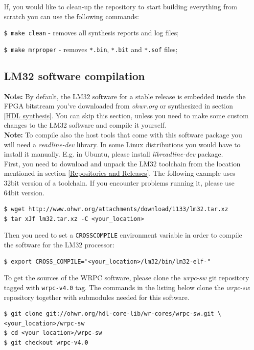 \documentclass[a4paper, 12pt]{article}
\renewcommand{\_}{\underscore\allowbreak}
\begin{document}
If, you would like to clean-up the repository to start building everything from
scratch you can use the following commands:
\begin{itemize*}
\item \texttt{\$ make clean} - removes all synthesis reports and log files;
\item \texttt{\$ make mrproper} - removes \texttt{*.bin}, \texttt{*.bit} and
  \texttt{*.sof} files;
\end{itemize*}

\subsection{LM32 software compilation}
\label{LM32 software compilation}

\textbf{Note:} By default, the LM32 software for a stable release is embedded
inside the FPGA bitstream you've downloaded from \textit{ohwr.org} or
synthesized in section \ref{HDL synthesis}. You can skip this section, unless
you need to make some custom changes to the LM32 software and compile it
yourself.\\

\textbf{Note:} To compile also the host tools that come with this software
package you will need a \emph{readline-dev} library. In some Linux distributions
you would have to install it manually. E.g. in Ubuntu, please install
\emph{libreadline-dev} package.\\

First, you need to download and unpack the LM32 toolchain from the location
mentioned in section \ref{Repositories and Releases}. The following example
uses 32bit version of a toolchain. If you encounter problems running it, please
use 64bit version.
\begin{lstlisting}
$ wget http://www.ohwr.org/attachments/download/1133/lm32.tar.xz
$ tar xJf lm32.tar.xz -C <your_location>
\end{lstlisting}

Then you need to set a \texttt{CROSS\_COMPILE} environment variable in order
to compile the software for the LM32 processor:
\begin{lstlisting}
$ export CROSS_COMPILE="<your_location>/lm32/bin/lm32-elf-"
\end{lstlisting}

To get the sources of the WRPC software, please clone the \textit{wrpc-sw} git
repository tagged with \texttt{wrpc-v4.0} tag. The commands in the listing below
clone the \textit{wrpc-sw} repository together with submodules needed for this software.\\
\begin{lstlisting}
$ git clone git://ohwr.org/hdl-core-lib/wr-cores/wrpc-sw.git \
<your_location>/wrpc-sw
$ cd <your_location>/wrpc-sw
$ git checkout wrpc-v4.0
\end{lstlisting}
\end{document}
